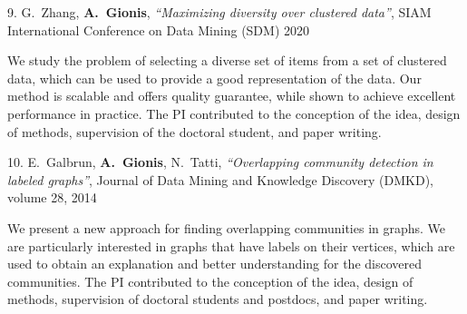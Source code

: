 \documentclass[a4paper,11pt]{article}
\begin{document}
\textbibspace

\item[{9.}]
{G.\ Zhang, \textbf{A.\ Gionis}},
{\em ``Maximizing diversity over clustered data''},
SIAM International Conference on Data Mining (SDM) 2020
%
\item[]
We study the problem of selecting a diverse set of items 
from a set of clustered data, which can be used to provide 
a good representation of the data. 
Our method is scalable and offers quality guarantee, 
while shown to achieve excellent performance in practice. 
The PI contributed to the conception of the idea, 
design of methods, supervision of the doctoral student, and paper writing.

\textbibspace

\item[{10.}]
{E.\ Galbrun, \textbf{A.\ Gionis}, N.\ Tatti}, 
{\em ``Overlapping community detection in labeled graphs''}, 
Journal of Data Mining and Knowledge Discovery (DMKD), volume 28, 2014
%
\item[]

We present a new approach for finding overlapping communities in graphs. 
We are particularly interested in graphs that have labels on their vertices, 
which are used to obtain an explanation and better understanding for the discovered communities.
The PI contributed to the conception of the idea, 
design of methods, supervision of doctoral students and postdocs, and paper writing.



\biblistnend

\end{document}

